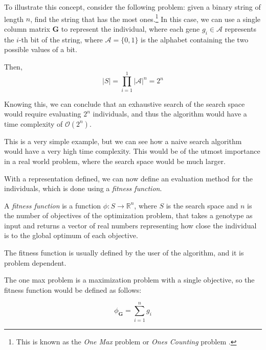   To illustrate this concept, consider the following problem: given a binary string of length
  \(n\), find the string that has the most ones.\footnote{
    This is known as the \emph{One Max} problem \autocite{OneMaxProblema} or \emph{Ones Counting}
    problem \autocite{wilhelmstotterJeneticsJavaGenetica}.
  }
  In this case, we can use a single column matrix \(\mathbf{G}\) to represent the individual, 
  where each gene \(g_i \in \mathcal{A}\) represents the \(i\)-th bit of the string, where 
  \(\mathcal{A} = \{0, 1\}\) is the alphabet containing the two possible values of a bit.
  
  Then,
  \[
    |S| = \prod_{i=1}^1 |\mathcal{A}|^n = 2^n
  \]

  Knowing this, we can conclude that an exhaustive search of the search space would require 
  evaluating \(2^n\) individuals, and thus the algorithm would have a time complexity of 
  \(\mathcal{O}(2^n)\).
  
  This is a very simple example, but we can see how a naive search algorithm would have a very
  high time complexity.
  This would be of the utmost importance in a real world problem, where the search space would be
  much larger.

  With a representation defined, we can now define an evaluation method for the individuals, which
  is done using a \emph{fitness function}.

  \begin{definition}
  \label{def:fitness_function}
    A \emph{fitness function} is a function \(\phi: S \rightarrow \mathbb{R}^n\), where \(S\) is the
    search space and \(n\) is the number of objectives of the optimization problem, that takes a
    genotype as input and returns a vector of real numbers representing how close the individual 
    is to the global optimum of each objective.

    The fitness function is usually defined by the user of the algorithm, and it is problem
    dependent.
  \end{definition}

  The one max problem is a maximization problem with a single objective, so the fitness function
  would be defined as follows:

  \begin{equation}
    \label{eq:fitness_function:one_max}
    \phi_\mathbf{G} = \sum_{i=1}^n g_i
  \end{equation}

